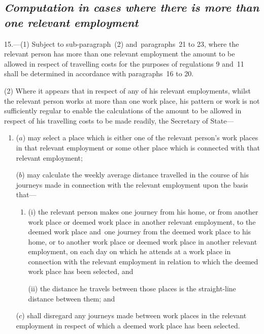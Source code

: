 \documentclass[12pt,a4paper]{article}
\begin{document}

\subsection*{\itshape Computation in cases where there is more than one relevant employment}

15.—(1) Subject to sub-paragraph~(2) and~paragraphs~21 to 23, where the relevant person has more than one relevant employment the amount to be allowed in respect of travelling costs for the purposes of regulations 9 and~11 shall be determined in accordance with paragraphs~16 to 20.

(2) Where it appears that in respect of any of his relevant employments, whilst the relevant person works at more than one work place, his pattern or work is not sufficiently regular to enable the calculations of the amount to be allowed in respect of his travelling costs to be made readily, the 
Secretary of State---  %
\begin{enumerate}\item[]
($a$) may select a place which is either one of the relevant person’s work places in that relevant employment or some other place which is connected with that relevant employment;

($b$) may calculate the weekly average distance travelled in the course of his journeys made in connection with the relevant employment upon the basis that—
\begin{enumerate}\item[]
(i) the relevant person makes one journey from his home, or from another work place or deemed work place in another relevant employment, to the deemed work place and~one journey from the deemed work place to his home, or to another work place or deemed work place in another relevant employment, on each day on which he attends at a work place in connection with the relevant employment in relation to which the deemed work place has been selected, and

(ii) the distance he travels between those places is the straight-line distance between them; and
\end{enumerate}

($c$) shall disregard any journeys made between work places in the relevant employment in respect of which a deemed work place has been selected.
\end{enumerate}
\end{document}
